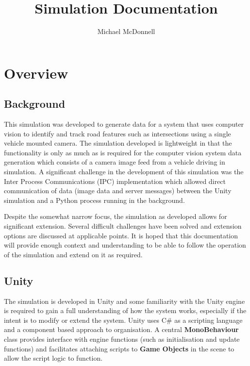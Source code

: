 \documentclass{article}
\begin{document}
\title{Simulation Documentation}
\author{Michael McDonnell}

\maketitle

\tableofcontents
\newpage

\section*{Overview}

\subsection*{Background}

This simulation was developed to generate data for a system that uses computer vision to identify and track road features such as intersections using a single vehicle mounted camera. The simulation developed is lightweight in that the functionality is only as much as is required for the computer vision system data generation which consists of a camera image feed from a vehicle driving in simulation. A significant challenge in the development of this simulation was the Inter Process Communications (IPC) implementation which allowed direct communication of data (image data and server messages) between the Unity simulation and a Python process running in the background.

Despite the somewhat narrow focus, the simulation as developed allows for significant extension. Several difficult challenges have been solved and extension options are discussed at applicable points. It is hoped that this documentation will provide enough context and understanding to be able to follow the operation of the simulation and extend on it as required.

\subsection*{Unity}

The simulation is developed in Unity and some familiarity with the Unity engine is required to gain a full understanding of how the system works, especially if the intent is to modify or extend the system. Unity uses C\# as a scripting language and a component based approach to organisation. A central \textbf{MonoBehaviour} class provides interface with engine functions (such as initialisation and update functions) and facilitates attaching scripts to \textbf{Game Objects} in the scene to allow the script logic to function. 
\end{document}
